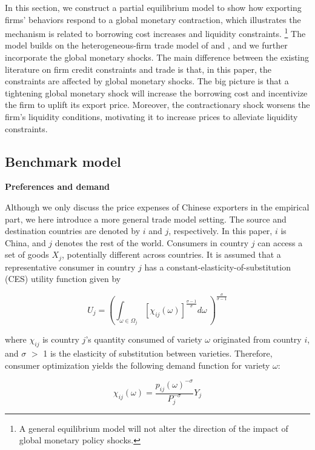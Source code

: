 In this section, we construct a partial equilibrium model to show how exporting firms' behaviors respond to a global monetary contraction, which illustrates the mechanism is related to borrowing cost increases and liquidity constraints.  \footnote{A general equilibrium model will not alter the direction of the impact of global monetary policy shocks.} The model builds on the heterogeneous-firm trade model of \cite{melitz2003impact} and \cite{manova2013credit}, and we further incorporate the global monetary shocks. The main difference between the existing literature on firm credit constraints and trade is that, in this paper, the constraints are affected by global monetary shocks. The big picture is that a tightening global monetary shock will increase the borrowing cost and incentivize the firm to uplift its export price. Moreover, the contractionary shock worsens the firm's liquidity conditions, motivating it to increase prices to alleviate liquidity constraints.

\subsection{Benchmark model}

\textbf{Preferences and demand}

Although we only discuss the price expenses of Chinese exporters in the empirical part, we here introduce a more general trade model setting. The source and destination countries are denoted by $i$ and $j$, respectively. In this paper, $i$ is China, and $j$ denotes the rest of the world. Consumers in country $j$ can access a set of goods $X_j$, potentially different across countries. It is assumed that a representative consumer in country $j$ has a constant-elasticity-of-substitution (CES) utility function given by

\begin{equation}
U_j=(\int_{\omega \in \Omega_j} [\chi_{ij}(\omega)]^{\frac{\sigma-1}{\sigma}} d\omega\ )^\frac{\sigma}{\sigma-1}
\end{equation}

where $\chi_{ij}$ is country $j$’s quantity consumed of variety $\omega$ originated from country $i$, and $\sigma$ $>$ 1 is the elasticity of substitution between varieties. Therefore, consumer optimization yields the following demand function for variety $\omega$:

\begin{equation}
\chi_{ij}(\omega)=\frac{p_{ij}(\omega)^{-\sigma}}{P_j^{-\sigma}} Y_j
\end{equation}


